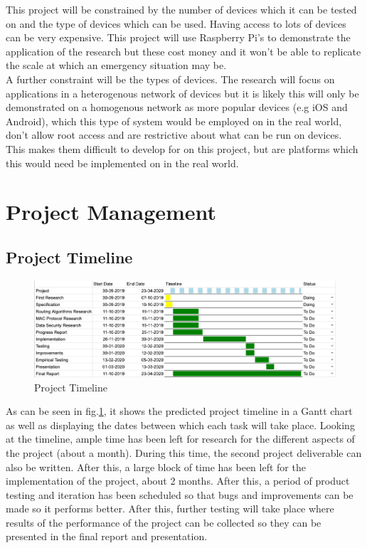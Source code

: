 \documentclass{report}
\begin{document}
This project will be constrained by the number of devices which it can be tested on and the type of devices which can be used. Having access 
to lots of devices can be very expensive. This project will use Raspberry Pi's to demonstrate the application of the research but these cost 
money and it won't be able to replicate the scale at which an emergency situation may be.
\bigskip\\
A further constraint will be the types of devices. The research will focus on applications in a heterogenous network of devices but it is 
likely this will only be demonstrated on a homogenous network as more popular devices (e.g iOS and Android\cite{mobileOS}), which this type of system would be employed on in the 
real world, don't allow root access and are restrictive about what can be run on devices. This makes them difficult to develop for on this project, but are platforms which 
this would need be implemented on in the real world.

\chapter*{Project Management}

\section*{Project Timeline}
\begin{figure}
    \centering
    \includegraphics[scale=0.35]{ProjectTimeline}
    \caption{Project Timeline}
    \label{fig:project-timeline}
\end{figure}
\bigskip

As can be seen in fig.\ref{fig:project-timeline}, it shows the predicted project timeline in a Gantt chart as well as displaying the dates between 
which each task will take place. Looking at the timeline, ample time has been left for research for the different aspects of the 
project (about a month). During this time, the second project deliverable can also be written. After this, a large block of time 
has been left for the implementation of the project, about 2 months. After this, a period of product testing and iteration has been 
scheduled so that bugs and improvements can be made so it performs better. After this, further testing will take place where results 
of the performance of the project can be collected so they can be presented in the final report and presentation. 
\end{document}
